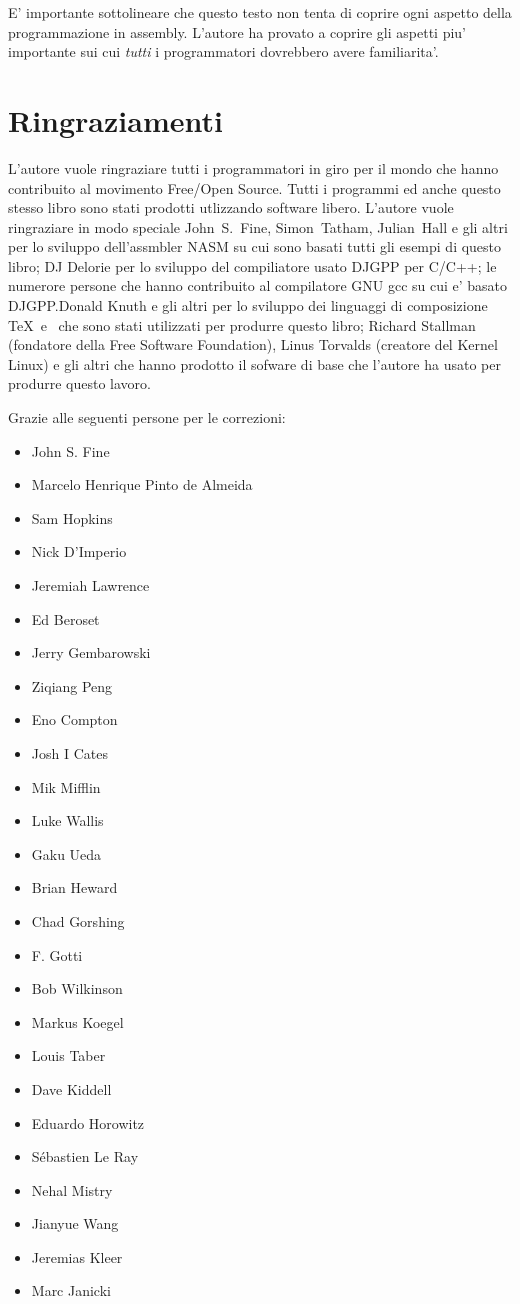 E' importante sottolineare che questo testo non tenta di coprire ogni 
aspetto della programmazione in assembly. L'autore ha provato a coprire
gli aspetti piu' importante sui cui \emph{tutti} i programmatori dovrebbero
avere  familiarita'.

\section*{Ringraziamenti}

L'autore vuole ringraziare tutti i programmatori in giro per il mondo
che hanno contribuito al movimento Free/Open Source. Tutti i programmi
ed anche questo stesso libro sono stati prodotti utlizzando software
libero. L'autore vuole ringraziare in modo speciale John~S.~Fine,
Simon~Tatham, Julian~Hall e gli altri per lo sviluppo dell'assmbler
NASM su cui sono basati tutti gli esempi di questo libro; DJ Delorie
per lo sviluppo del compiliatore usato DJGPP per C/C++; le numerore
persone che hanno contribuito al compilatore GNU gcc su cui e' 
basato DJGPP.Donald Knuth e gli altri per lo sviluppo dei linguaggi
di composizione \TeX\ e \LaTeXe\ che sono stati utilizzati per 
produrre questo libro; Richard Stallman (fondatore della Free Software
Foundation), Linus Torvalds (creatore del Kernel Linux) e gli altri 
che hanno prodotto il sofware di base che l'autore ha usato per 
produrre questo lavoro.

Grazie alle seguenti persone per le correzioni:
\begin{itemize}
\item John S. Fine
\item Marcelo Henrique Pinto de Almeida
\item Sam Hopkins
\item Nick D'Imperio
\item Jeremiah Lawrence
\item Ed Beroset
\item Jerry Gembarowski
\item Ziqiang Peng
\item Eno Compton
\item Josh I Cates
\item Mik Mifflin
\item Luke Wallis
\item Gaku Ueda
\item Brian Heward
\item Chad Gorshing
\item F. Gotti
\item Bob Wilkinson
\item Markus Koegel
\item Louis Taber
\item Dave Kiddell
\item Eduardo Horowitz
\item S\'{e}bastien Le Ray
\item Nehal Mistry
\item Jianyue Wang
\item Jeremias Kleer
\item Marc Janicki
\end{itemize}


